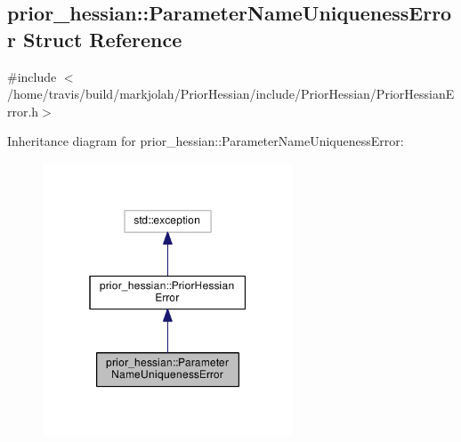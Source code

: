 \hypertarget{structprior__hessian_1_1ParameterNameUniquenessError}{}\subsection{prior\+\_\+hessian\+:\+:Parameter\+Name\+Uniqueness\+Error Struct Reference}
\label{structprior__hessian_1_1ParameterNameUniquenessError}


{\ttfamily \#include $<$/home/travis/build/markjolah/\+Prior\+Hessian/include/\+Prior\+Hessian/\+Prior\+Hessian\+Error.\+h$>$}



Inheritance diagram for prior\+\_\+hessian\+:\+:Parameter\+Name\+Uniqueness\+Error\+:\nopagebreak
\begin{figure}[H]
\begin{center}
\leavevmode
\includegraphics[width=211pt]{structprior__hessian_1_1ParameterNameUniquenessError__inherit__graph}
\end{center}
\end{figure}



